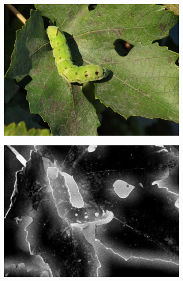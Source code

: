 \begin{figure}[H]
    \begin{subfigure}{0.32\textwidth}
      \centering
      \includegraphics[scale=1.0]{obrazky/ORIGhousenka.JPG}
    \end{subfigure}
    \begin{subfigure}{.32\textwidth}
      \centering
      \includegraphics[scale=1.0]{obrazky/StentifordSMhousenka.jpg}
    \end{subfigure}
    \begin{subfigure}{.32\textwidth}
      \centering

\end{subfigure}
\end{figure}

